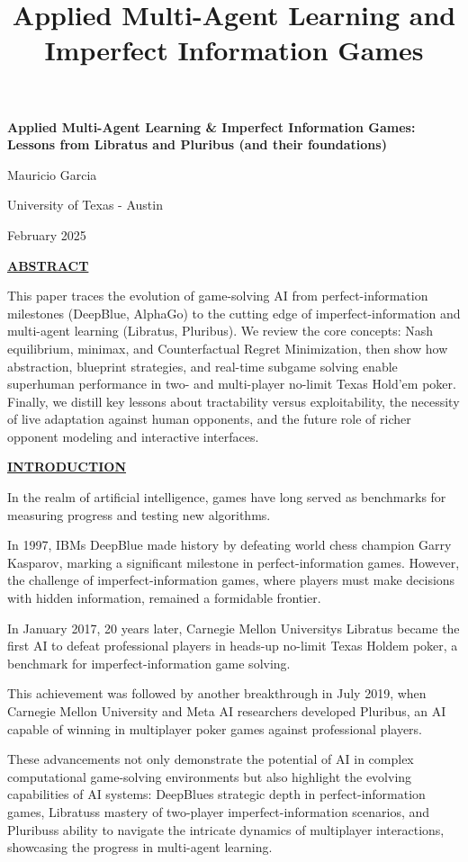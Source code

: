 \documentclass[
]{article}
\title{Applied Multi-Agent Learning and Imperfect Information Games}
\author{}
\date{}
\begin{document}
\maketitle

\textbf{Applied Multi-Agent Learning \& Imperfect Information Games:
Lessons from Libratus and Pluribus (and their foundations)}

Mauricio Garcia

University of Texas - Austin

February 2025

\textbf{\ul{ABSTRACT}}

This paper traces the evolution of game-solving AI from
perfect-information milestones (DeepBlue, AlphaGo) to the cutting edge
of imperfect-information and multi-agent learning (Libratus, Pluribus).
We review the core concepts: Nash equilibrium, minimax, and
Counterfactual Regret Minimization, then show how abstraction, blueprint
strategies, and real-time subgame solving enable superhuman performance
in two- and multi-player no-limit Texas Hold'em poker. Finally, we
distill key lessons about tractability versus exploitability, the
necessity of live adaptation against human opponents, and the future
role of richer opponent modeling and interactive interfaces.

\textbf{\ul{INTRODUCTION}}

In the realm of artificial intelligence, games have long served as
benchmarks for measuring progress and testing new algorithms.

In 1997, IBM\textquotesingle s DeepBlue made history by defeating world
chess champion Garry Kasparov, marking a significant milestone in
perfect-information games. However, the challenge of
imperfect-information games, where players must make decisions with
hidden information, remained a formidable frontier.

In January 2017, 20 years later, Carnegie Mellon
University\textquotesingle s Libratus became the first AI to defeat
professional players in heads-up no-limit Texas Hold\textquotesingle em
poker, a benchmark for imperfect-information game solving.

This achievement was followed by another breakthrough in July 2019, when
Carnegie Mellon University and Meta AI researchers developed Pluribus,
an AI capable of winning in multiplayer poker games against professional
players.

These advancements not only demonstrate the potential of AI in complex
computational game-solving environments but also highlight the evolving
capabilities of AI systems: DeepBlue\textquotesingle s strategic depth
in perfect-information games, Libratus\textquotesingle s mastery of
two-player imperfect-information scenarios, and
Pluribus\textquotesingle s ability to navigate the intricate dynamics of
multiplayer interactions, showcasing the progress in multi-agent
learning.
\end{document}
